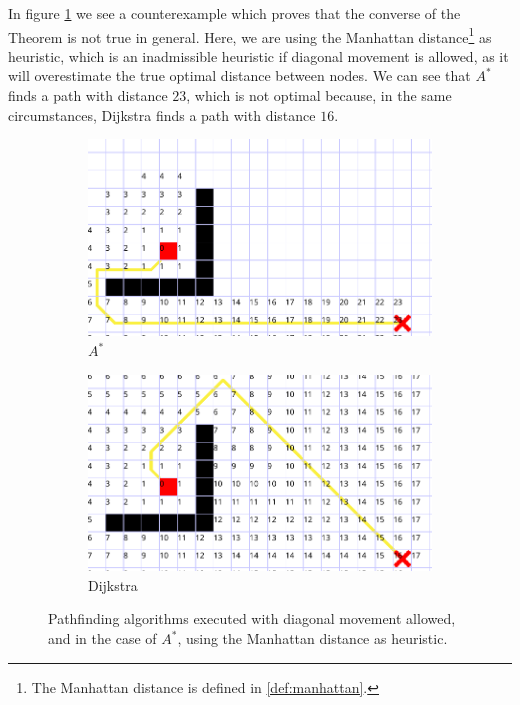 \documentclass[a4paper,10pt]{report}
\begin{document}
In figure \ref{fig:counterexample:admissible} we see a counterexample which proves that the converse of the Theorem is not true in general. Here, we are using the Manhattan distance\footnote{The Manhattan distance is defined in \ref{def:manhattan}.} as heuristic, which is an inadmissible heuristic if diagonal movement is allowed, as it will overestimate the true optimal distance between nodes. We can see that $A^*$ finds a path with distance $23$, which is not optimal because, in the same circumstances, Dijkstra finds a path with distance $16$.

\begin{figure}
\centering
\begin{subfigure}[b]{0.65\textwidth}
	\includegraphics[width=1\linewidth]{astar-fail}
	\caption{$A^*$}
\end{subfigure}
\begin{subfigure}[b]{0.65\textwidth}
	\includegraphics[width=1\linewidth]{astar-fail-dijkstra}
	\caption{Dijkstra}
\end{subfigure}
\caption{Pathfinding algorithms executed with diagonal movement allowed, and in the case of $A^*$, using the Manhattan distance as heuristic.}
\label{fig:counterexample:admissible}
\end{figure}
\end{document}
